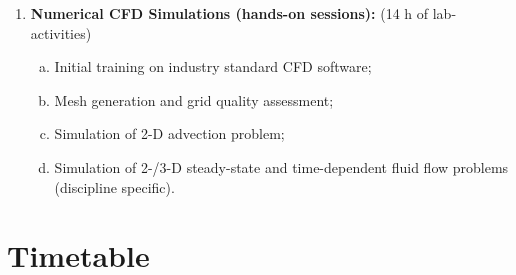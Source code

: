 \documentclass[12pts,a4paper,amsmath,amssymb,floatfix]{article}%
\begin{document}
\begin{enumerate}[{\bf Module 1}]
\item {\bf Numerical CFD Simulations (hands-on sessions):} (14 h of lab-activities)\label{Mod:Fluent}
   \begin{enumerate}[(a)]
      \item Initial training on industry standard CFD software;
      \item Mesh generation and grid quality assessment;
      \item Simulation of 2-D advection problem;
      \item Simulation of 2-/3-D steady-state and time-dependent fluid flow problems (discipline specific).
   \end{enumerate}

\end{enumerate}


\pagebreak


\section{Timetable}%
\end{document}
